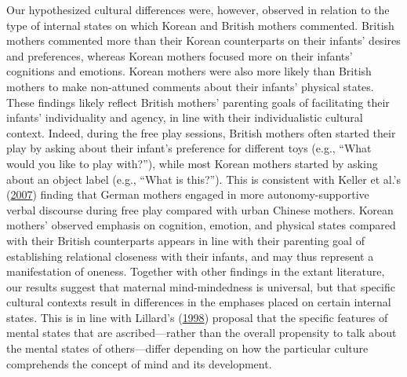 \documentclass[
]{article}
\begin{document}
Our hypothesized cultural differences were, however, observed in relation to the type of internal states on which Korean and British mothers commented. British mothers commented more than their Korean counterparts on their infants' desires and preferences, whereas Korean mothers focused more on their infants' cognitions and emotions. Korean mothers were also more likely than British mothers to make non-attuned comments about their infants' physical states. These findings likely reflect British mothers' parenting goals of facilitating their infants' individuality and agency, in line with their individualistic cultural context. Indeed, during the free play sessions, British mothers often started their play by asking about their infant's preference for different toys (e.g., ``What would you like to play with?''), while most Korean mothers started by asking about an object label (e.g., ``What is this?''). This is consistent with Keller et al.'s (\protect\hyperlink{ref-Keller2007}{2007}) finding that German mothers engaged in more autonomy-supportive verbal discourse during free play compared with urban Chinese mothers. Korean mothers' observed emphasis on cognition, emotion, and physical states compared with their British counterparts appears in line with their parenting goal of establishing relational closeness with their infants, and may thus represent a manifestation of oneness. Together with other findings in the extant literature, our results suggest that maternal mind-mindedness is universal, but that specific cultural contexts result in differences in the emphases placed on certain internal states. This is in line with Lillard's (\protect\hyperlink{ref-Lillard1998}{1998}) proposal that the specific features of mental states that are ascribed---rather than the overall propensity to talk about the mental states of others---differ depending on how the particular culture comprehends the concept of mind and its development.
\end{document}
